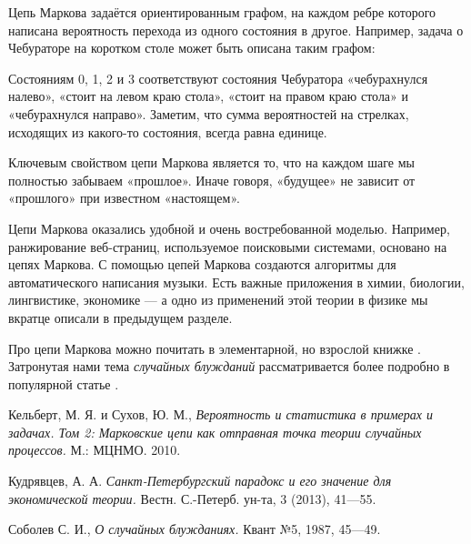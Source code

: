 \documentclass{article}
\begin{document}
Цепь Маркова задаётся ориентированным графом, 
на каждом ребре которого написана вероятность перехода из одного состояния в другое.
Например, задача о Чебураторе на коротком столе может быть описана таким графом:
\begin{center}
\end{center}
Состояниям 0, 1, 2 и 3 соответствуют состояния Чебуратора «чебурахнулся налево», «стоит на левом краю стола», «стоит на правом краю стола» и «чебурахнулся направо».
Заметим, что сумма вероятностей на стрелках, исходящих из какого-то состояния, всегда равна единице.

Ключевым свойством цепи Маркова является то, что на каждом шаге
мы полностью забываем «прошлое».
Иначе говоря, «будущее» не зависит от «прошлого» при известном «настоящем».

Цепи Маркова оказались удобной и очень востребованной моделью.
Например, ранжирование веб-страниц, используемое поисковыми системами, основано на цепях Маркова.
С помощью цепей Маркова создаются алгоритмы для автоматического написания музыки.
Есть важные приложения в химии, биологии, лингвистике, экономике --- а одно из применений этой теории в физике мы вкратце описали в предыдущем разделе.

Про цепи Маркова можно почитать в элементарной, но взрослой книжке \cite{kemeny}.
Затронутая нами тема \emph{случайных блужданий} рассматривается более подробно в популярной статье \cite{sobolev}.

\begin{thebibliography}{52}
Кельберт, М. Я. и Сухов, Ю. М., 
\emph{Вероятность и статистика в примерах и задачах. Том 2: 
Марковские цепи как отправная точка теории случайных процессов.} 
М.: МЦНМО. 2010.

Кудрявцев, А. А. 
\emph{Санкт-Петербургский парадокс и его значение для экономической теории.} 
Вестн. С.-Петерб. ун-та, 3 (2013), 41---55.

Соболев С. И., 
\emph{О случайных блужданиях.} 
Квант №5, 1987, 45---49.

\end{thebibliography}
\end{document}
